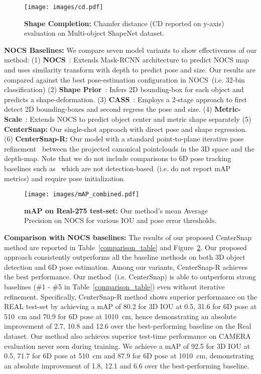 \documentclass[letter, 10pt, conference]{ieeeconf}
\begin{document}
\begin{figure}[!b]
\centering
\texttt{[image: images/cd.pdf]}
\centering
  \caption{
  \textbf{Shape Completion:} Chamfer distance (CD reported on y-axis) evaluation on Multi-object ShapeNet dataset.
  }
  \label{shape_completion}
\end{figure}
\textbf{NOCS Baselines:}
We compare seven model variants to show effectiveness of our method:
(1) \textbf{NOCS}~\cite{wang2019normalized}: Extends Mask-RCNN architecture to predict NOCS map and uses similarity transform with depth to predict pose and size. Our results are compared against the best pose-estimation configuration in NOCS~(i.e. 32-bin classification) (2) \textbf{Shape Prior}~\cite{tian2020shape}: Infers 2D bounding-box for each object and predicts a shape-deformation. (3) \textbf{CASS}~\cite{chen2020learning}: Employs a 2-stage approach to first detect 2D bounding-boxes and second regress the pose and size. (4) \textbf{Metric-Scale}~\cite{lee2021category}: Extends NOCS to predict object center and metric shape separately (5) \textbf{CenterSnap:} Our single-shot approach with direct pose and shape regression. (6) \textbf{CenterSnap-R:} Our model with a standard point-to-plane iterative pose refinement~\cite{segal2009generalized, Zhou2018} between the projected canonical pointclouds in the 3D space and the depth-map.  Note that we do not include comparisons to 6D pose tracking baselines such as~\cite{wang20206, wen2021bundletrack} which are not detection-based~(i.e. do not report mAP metrics) and require pose initialization. \\
\begin{figure}[!b]
\centering
\texttt{[image: images/mAP\_combined.pdf]}
\centering
  \caption{
  \textbf{mAP on Real-275 test-set:} Our method's mean Average Precision on NOCS for various IOU and pose error thresholds.
  }
  \label{nocs_resut}
\end{figure}
\textbf{Comparison with NOCS baselines:} The results of our proposed CenterSnap method are reported in Table~\ref{comparison_table} and Figure~\ref{nocs_resut}. Our proposed approach consistently outperforms all the baseline methods on both 3D object detection and 6D pose estimation. Among our variants, CenterSnap-R achieves the best performance. Our method~(i.e. CenterSnap) is able to outperform strong baselines (\#1 - \#5 in Table~\ref{comparison_table}) even without iterative refinement. Specifically, CenterSnap-R method shows superior performance on the REAL test-set by achieving a mAP of 80.2 for 3D IOU at 0.5, 31.6 for 6D pose at 5\textdegree \SI{10}{\cm} and 70.9 for 6D pose at 10\textdegree \SI{10}{\cm}, hence demonstrating an absolute improvement of 2.7, 10.8 and 12.6 over the best-performing baseline on the Real dataset.  Our method also achieves superior test-time performance on CAMERA evaluation never seen during training. We achieve a mAP of 92.5 for 3D IOU at 0.5, 71.7 for 6D pose at 5\textdegree \SI{10}{\cm} and 87.9 for 6D pose at 10\textdegree \SI{10}{\cm}, demonstrating an absolute improvement of 1.8, 12.1 and 6.6 over the best-performing baseline. \\
\end{document}
